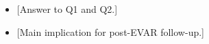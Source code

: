 \begin{itemize}
    \item {[}Answer to Q1 and Q2.]
    \item {[}Main implication for post-EVAR follow-up.]
\end{itemize}
